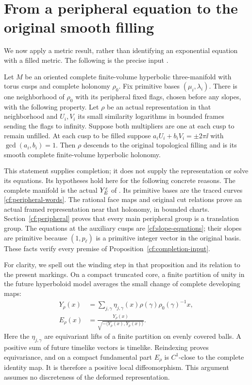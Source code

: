 \section{From a peripheral equation to the original smooth filling}
\label{cf:metric}

We now apply a metric result, rather than identifying an
exponential equation with a filled metric.
The following is the precise input
\cite[Proposition~6.1]{Marked}.

\begin{proposition}
\label{cf:completion-input}
Let $M$ be an oriented complete finite-volume hyperbolic
three-manifold with torus cusps and complete holonomy $\rho_0$.
Fix primitive bases $(\mu_i,\lambda_i)$.
There is one neighborhood of $\rho_0$ with its peripheral fixed
flags, chosen before any slopes, with the following property.
Let $\rho$ be an actual representation in that neighborhood and
$U_i,V_i$ its small similarity logarithms in bounded frames
sending the flags to infinity. Suppose both multipliers are one
at each cusp to remain unfilled. At each cusp to be filled suppose
$a_iU_i+b_iV_i=\pm2\pi\ii$ with $\gcd(a_i,b_i)=1$.
Then $\rho$ descends to the original topological filling and
is its smooth complete finite-volume hyperbolic holonomy.
\end{proposition}

This statement supplies completion; it does not supply the
representation or solve its equations. Its hypotheses hold here
for the following concrete reasons.
The complete manifold is the actual $Y^\varepsilon_E$ of
\cite[Theorem~1.2]{Geometry}. Its primitive bases are the traced
curves \eqref{cf:peripheral-words}. The rational face maps and
original cut relations prove an actual framed representation
near that holonomy, in bounded charts. Section~\ref{cf:peripheral}
proves that every main peripheral group is a translation group.
The equations at the auxiliary cusps are
\eqref{cf:slope-equations}; their slopes are primitive because
$(1,p_\ell)$ is a primitive integer vector in the original basis.
These facts verify every premise of
Proposition~\ref{cf:completion-input}.

For clarity, we spell out the winding step in that proposition
and its relation to the present markings. On a compact truncated
core, a finite partition of unity in the future hyperboloid
model averages the small change of complete developing maps:
\begin{equation}\label{cf:core}
 \begin{split}
 Y_\rho(x)&=\sum_{j,\gamma}
       \eta_{j,\gamma}(x)\rho(\gamma)\rho_0(\gamma)^{-1}x,\\
 E_\rho(x)&=\frac{Y_\rho(x)}
       {\sqrt{-\langle Y_\rho(x),Y_\rho(x)\rangle}} .
 \end{split}
\end{equation}
Here the $\eta_{j,\gamma}$ are equivariant lifts of a finite
partition on evenly covered balls. A positive sum of future
timelike vectors is timelike. Reindexing proves equivariance,
and on a compact fundamental part $E_\rho$ is $C^1$-close to
the complete identity map. It is therefore a positive local
diffeomorphism. This argument assumes no discreteness of
the deformed representation.

